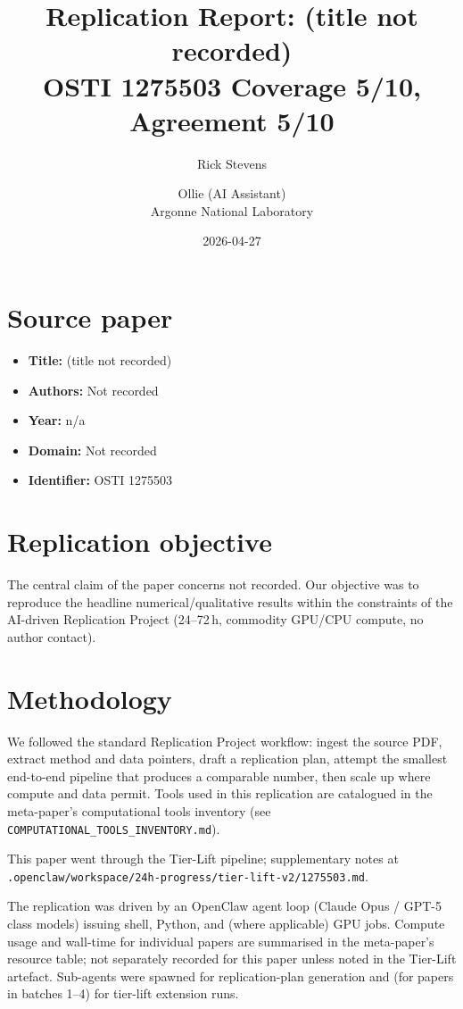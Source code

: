 \documentclass[11pt]{article}
\title{Replication Report: (title not recorded)\\[2pt]\large OSTI 1275503 \textbar{} Coverage 5/10, Agreement 5/10}
\author{Rick Stevens \and Ollie (AI Assistant)\\\small Argonne National Laboratory}
\date{2026-04-27}
\begin{document}
\maketitle

\section{Source paper}
\begin{itemize}
\item \textbf{Title:} (title not recorded)
\item \textbf{Authors:} Not recorded
\item \textbf{Year:} n/a
\item \textbf{Domain:} Not recorded
\item \textbf{Identifier:} OSTI 1275503
\end{itemize}


\section{Replication objective}
The central claim of the paper concerns not recorded. Our objective was to reproduce the headline numerical/qualitative results within the constraints of the AI-driven Replication Project (24--72\,h, commodity GPU/CPU compute, no author contact). 

\section{Methodology}
We followed the standard Replication Project workflow: ingest the source PDF, extract method and data pointers, draft a replication plan, attempt the smallest end-to-end pipeline that produces a comparable number, then scale up where compute and data permit. Tools used in this replication are catalogued in the meta-paper's computational tools inventory (see \texttt{COMPUTATIONAL\_TOOLS\_INVENTORY.md}).

This paper went through the Tier-Lift pipeline; supplementary notes at \texttt{.openclaw/workspace/24h-progress/tier-lift-v2/1275503.md}.



The replication was driven by an OpenClaw agent loop (Claude Opus / GPT-5 class models) issuing shell, Python, and (where applicable) GPU jobs. Compute usage and wall-time for individual papers are summarised in the meta-paper's resource table; not separately recorded for this paper unless noted in the Tier-Lift artefact. Sub-agents were spawned for replication-plan generation and (for papers in batches 1--4) for tier-lift extension runs.
\end{document}

